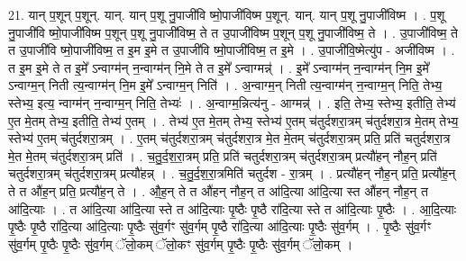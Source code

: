 \documentclass[17pt]{extarticle}
\begin{document}
21. यान् प॒शून् प॒शून्. यान्. यान् प॒शू नु॒पाजी॑वि ष्मो॒पाजी॑विष्म प॒शून्. यान्. यान् प॒शू नु॒पाजी॑विष्म । . प॒शू नु॒पाजी॑वि ष्मो॒पाजी॑विष्म प॒शून् प॒शू नु॒पाजी॑विष्म॒ ते त उ॒पाजी॑विष्म प॒शून् प॒शू नु॒पाजी॑विष्म॒ ते । . उ॒पाजी॑विष्म॒ ते त उ॒पाजी॑वि ष्मो॒पाजी॑विष्म॒ त इ॒म इ॒मे त उ॒पाजी॑वि ष्मो॒पाजी॑विष्म॒ त इ॒मे । . उ॒पाजी॑वि॒ष्मेत्यु॑प - अजी॑विष्म । . त इ॒म इ॒मे ते त इ॒मे᳚ ऽन्वाग्म॑न् न॒न्वाग्म॑न् नि॒मे ते त इ॒मे᳚ ऽन्वाग्मन्न्॑ । . इ॒मे᳚ ऽन्वाग्म॑न् न॒न्वाग्म॑न् नि॒म इ॒मे᳚ ऽन्वाग्म॒न् निती त्य॒न्वाग्म॑न् नि॒म इ॒मे᳚ ऽन्वाग्म॒न् निति॑ । . अ॒न्वाग्म॒न् निती त्य॒न्वाग्म॑न् न॒न्वाग्म॒न् निति॒ तेभ्य॒ स्तेभ्य॒ इत्य॒ न्वाग्म॑न् न॒न्वाग्म॒न् निति॒ तेभ्यः॑ । . अ॒न्वाग्म॒न्नित्य॑नु - आग्मन्न्॑ । . इति॒ तेभ्य॒ स्तेभ्य॒ इतीति॒ तेभ्य॑ ए॒त मे॒तम् तेभ्य॒ इतीति॒ तेभ्य॑ ए॒तम् । . तेभ्य॑ ए॒त मे॒तम् तेभ्य॒ स्तेभ्य॑ ए॒तम् च॑तुर्दशरा॒त्रम् च॑तुर्दशरा॒त्र मे॒तम् तेभ्य॒ स्तेभ्य॑ ए॒तम् च॑तुर्दशरा॒त्रम् । . ए॒तम् च॑तुर्दशरा॒त्रम् च॑तुर्दशरा॒त्र मे॒त मे॒तम् च॑तुर्दशरा॒त्रम् प्रति॒ प्रति॑ चतुर्दशरा॒त्र मे॒त मे॒तम् च॑तुर्दशरा॒त्रम् प्रति॑ । . च॒तु॒र्द॒श॒रा॒त्रम् प्रति॒ प्रति॑ चतुर्दशरा॒त्रम् च॑तुर्दशरा॒त्रम् प्रत्यौ॑हन् नौह॒न् प्रति॑ चतुर्दशरा॒त्रम् च॑तुर्दशरा॒त्रम् प्रत्यौ॑हन्न् । . च॒तु॒र्द॒श॒रा॒त्रमिति॑ चतुर्दश - रा॒त्रम् । . प्रत्यौ॑हन् नौह॒न् प्रति॒ प्रत्यौ॑ह॒न् ते त औ॑ह॒न् प्रति॒ प्रत्यौ॑ह॒न् ते । . औ॒ह॒न् ते त औ॑हन् नौह॒न् त आ॑दि॒त्या आ॑दि॒त्या स्त औ॑हन् नौह॒न् त आ॑दि॒त्याः । . त आ॑दि॒त्या आ॑दि॒त्या स्ते त आ॑दि॒त्याः पृ॒ष्ठैः पृ॒ष्ठै रा॑दि॒त्या स्ते त आ॑दि॒त्याः पृ॒ष्ठैः । . आ॒दि॒त्याः पृ॒ष्ठैः पृ॒ष्ठै रा॑दि॒त्या आ॑दि॒त्याः पृ॒ष्ठैः सु॑व॒र्गꣳ सु॑व॒र्गम् पृ॒ष्ठै रा॑दि॒त्या आ॑दि॒त्याः पृ॒ष्ठैः सु॑व॒र्गम् । . पृ॒ष्ठैः सु॑व॒र्गꣳ सु॑व॒र्गम् पृ॒ष्ठैः पृ॒ष्ठैः सु॑व॒र्गम् ॅलो॒कम् ॅलो॒कꣳ सु॑व॒र्गम् पृ॒ष्ठैः पृ॒ष्ठैः सु॑व॒र्गम् ॅलो॒कम् । \newline
\end{document}
